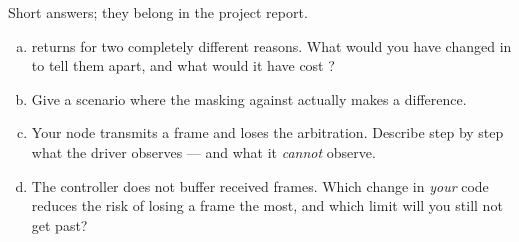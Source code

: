 \label{ex:10:4}
Short answers; they belong in the project report.
\begin{enumerate}[a)]
  \item {} returns  for two completely different reasons. What would you
    have changed in  to tell them apart, and what would it have cost ?
  \item Give a scenario where the masking against  actually makes a difference.
  \item Your node transmits a frame and loses the arbitration. Describe step by step what the
    driver observes --- and what it \emph{cannot} observe.
  \item The controller does not buffer received frames. Which change in \emph{your} code reduces
    the risk of losing a frame the most, and which limit will you still not get past?
\end{enumerate}
